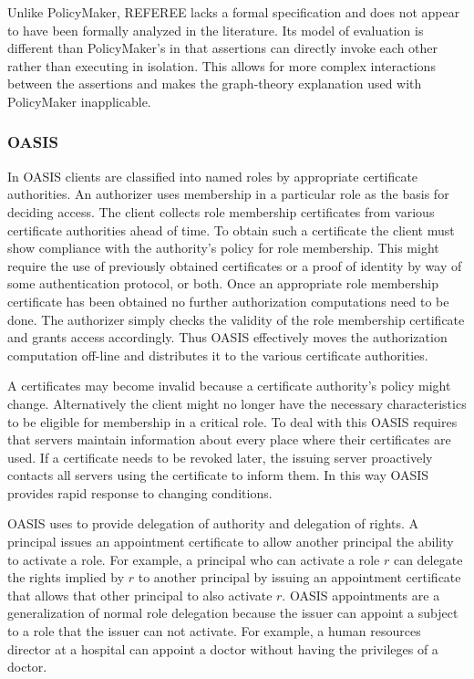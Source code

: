 Unlike PolicyMaker, REFEREE lacks a formal specification and does not
appear to have been formally analyzed in the literature. Its model of
evaluation is different than PolicyMaker's in that assertions can directly
invoke each other rather than executing in isolation. This allows for more
complex interactions between the assertions and makes the graph-theory
explanation used with PolicyMaker inapplicable.

\subsubsection{OASIS}

In OASIS
\cite{Hayton:ACODE,Hine:ADOS,Bacon:MORBACSAS,Dimmock:UTRRBACP} clients
are classified into named roles by appropriate certificate
authorities. An authorizer uses membership in a particular role as the
basis for deciding access. The client collects role membership
certificates from various certificate authorities ahead of time. To
obtain such a certificate the client must show
compliance with the authority's policy for role membership. This might
require the use of previously obtained certificates or a proof of
identity by way of some authentication protocol, or both. Once an
appropriate role membership certificate has been obtained no further
authorization computations need to be done. The authorizer
simply checks the validity of the role membership certificate and
grants access accordingly. Thus OASIS effectively moves the authorization
computation off-line and distributes it to the various
certificate authorities.

A certificates may become invalid because a certificate
authority's policy might change. Alternatively the client might no longer
have the necessary characteristics to be eligible for membership in a
critical role. To deal with this OASIS requires that servers maintain
information about every place where their certificates are used. If a
certificate needs to be revoked later, the issuing server proactively
contacts all servers using the certificate to inform them. In this way
OASIS provides rapid response to changing conditions.

OASIS uses  to provide delegation of
authority and delegation of rights. A principal issues an appointment
certificate to allow another principal the ability to activate a role. For
example, a principal who can activate a role $r$ can delegate the rights
implied by $r$ to another principal by issuing an appointment certificate
that allows that other principal to also activate $r$. OASIS appointments
are a generalization of normal role delegation because the issuer can
appoint a subject to a role that the issuer can not activate. For example,
a human resources director at a hospital can appoint a doctor without
having the privileges of a doctor.

